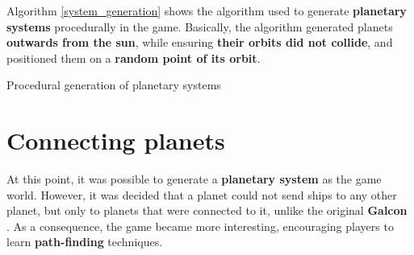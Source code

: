 \documentclass[a4paper,11pt,titlepage,abstract,numbers=noenddot,automark,mnsy,intlimits,rgb,dvipsnames]{report}
\begin{document}
Algorithm \autoref{system_generation} shows the algorithm used to generate \textbf{planetary systems} procedurally in the game.
Basically, the algorithm generated planets \textbf{outwards from the sun}, while ensuring \textbf{their orbits did not collide},
and positioned them on a \textbf{random point of its orbit}.
\begin{algorithm}
\caption{Procedural generation of planetary systems}
\label{system_generation}
\begin{algorithmic}
\ENDFOR
\end{algorithmic}
\end{algorithm}
\clearpage
\section{Connecting planets}
At this point, it was possible to generate a \textbf{planetary system} as the game world. However, it was decided that a planet
could not send ships to any other planet, but only to planets that were connected to it, unlike the original \textbf{Galcon} \cite{galcon}.
As a consequence, the game became more interesting, encouraging players to learn \textbf{path-finding} techniques.
\end{document}
